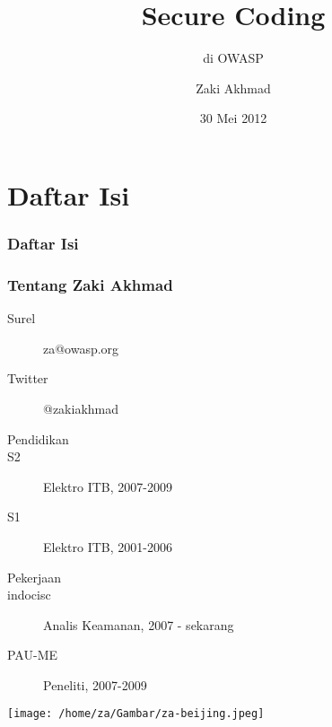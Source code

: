 \documentclass[xcolor=pdftex,table,handouts]{beamer}
\begin{document}

\title{Secure Coding}
\subtitle{di OWASP}
\author{Zaki Akhmad}
\date{30 Mei 2012}

\begin{frame}
	\titlepage
\end{frame}

\section*{Daftar Isi}

\begin{frame}
	\frametitle{Daftar Isi}
		\tableofcontents
\end{frame}


\begin{frame}
	\frametitle{Tentang Zaki Akhmad}
			\begin{description}
				\item[Surel] za@owasp.org
				\item[Twitter] @zakiakhmad	
				\item[Pendidikan]
				\item[S2] Elektro ITB, 2007-2009
				\item[S1] Elektro ITB, 2001-2006
				\item[Pekerjaan]
				\item[indocisc] Analis Keamanan, 2007 - sekarang
				\item[PAU-ME] Peneliti, 2007-2009
			\end{description}
 			\begin{flushleft}
				\texttt{[image: /home/za/Gambar/za-beijing.jpeg]}
			\end{flushleft}
\end{frame}
\end{document}
